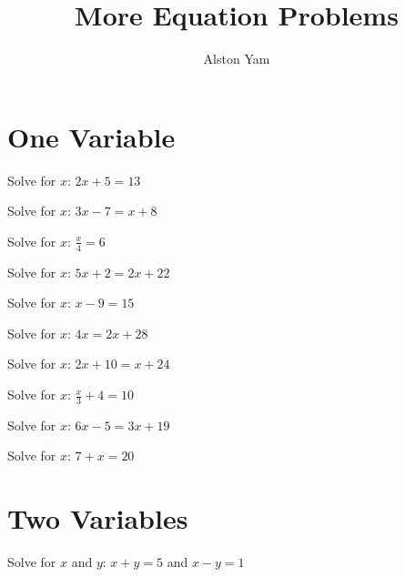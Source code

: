 \documentclass{article}
\title{More Equation Problems}
\author{Alston Yam}
\date{}
\theoremstyle{mytheoremstyle}
\theoremstyle{mytheoremstyle}
\theoremstyle{myproblemstyle}
\begin{document}
    \maketitle

        \section{One Variable}

        \begin{problem}
        Solve for $x$: $2x + 5 = 13$
        \end{problem}

        \begin{problem}
        Solve for $x$: $3x - 7 = x + 8$
        \end{problem}

        \begin{problem}
        Solve for $x$: $\frac{x}{4} = 6$
        \end{problem}

        \begin{problem}
        Solve for $x$: $5x + 2 = 2x + 22$
        \end{problem}

        \begin{problem}
        Solve for $x$: $x - 9 = 15$
        \end{problem}

        \begin{problem}
        Solve for $x$: $4x = 2x + 28$
        \end{problem}

        \begin{problem}
        Solve for $x$: $2x + 10 = x + 24$
        \end{problem}

        \begin{problem}
        Solve for $x$: $\frac{x}{3} + 4 = 10$
        \end{problem}

        \begin{problem}
        Solve for $x$: $6x - 5 = 3x + 19$
        \end{problem}

        \begin{problem}
        Solve for $x$: $7 + x = 20$
        \end{problem}
    

        \section{Two Variables}
        \begin{problem}
        Solve for $x$ and $y$: $x + y = 5$ and $x - y = 1$
        \end{problem}
\end{document}
